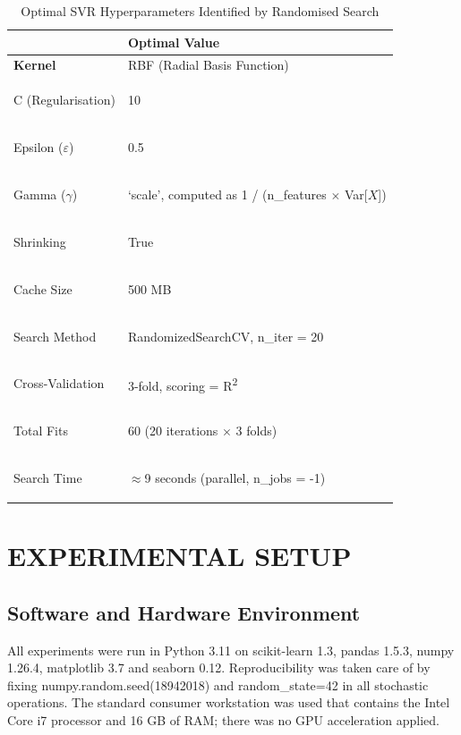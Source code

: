 \documentclass[pdflatex,sn-mathphys-num]{sn-jnl}
\begin{document}
\begin{table}[h]
\centering
\renewcommand{\arraystretch}{1.5}
\setlength{\tabcolsep}{10pt}

\caption{Optimal SVR Hyperparameters Identified by Randomised Search}
\begin{tabular}{|>{\bfseries}l|p{9cm}|}
\hline
\rowcolor[HTML]{2F4F7F}
\multicolumn{1}{|>{\color{white}\bfseries}l|}{\color{white} Hyperparameter} &
\multicolumn{1}{l|}{\color{white} Optimal Value} \\ \hline

Kernel & RBF (Radial Basis Function) \\ \hline

\rowcolor[HTML]{E6E6E6}
C (Regularisation) & 10 \\ \hline

Epsilon ($\varepsilon$) & 0.5 \\ \hline

\rowcolor[HTML]{E6E6E6}
Gamma ($\gamma$) & `scale', computed as 1 / (n\_features $\times$ Var[$X$]) \\ \hline

Shrinking & True \\ \hline

\rowcolor[HTML]{E6E6E6}
Cache Size & 500 MB \\ \hline

Search Method & RandomizedSearchCV, n\_iter = 20 \\ \hline

\rowcolor[HTML]{E6E6E6}
Cross-Validation & 3-fold, scoring = R\textsuperscript{2} \\ \hline

Total Fits & 60 (20 iterations $\times$ 3 folds) \\ \hline

\rowcolor[HTML]{E6E6E6}
Search Time & $\approx$9 seconds (parallel, n\_jobs = -1) \\ \hline

\end{tabular}
\end{table}

\section{EXPERIMENTAL SETUP}
\subsection{Software and Hardware Environment}
All experiments were run in Python 3.11 on scikit-learn 1.3, pandas 1.5.3, numpy 1.26.4, matplotlib 3.7 and seaborn 0.12. Reproducibility was taken care of by fixing numpy.random.seed(18942018) and random\_state=42 in all stochastic operations. The standard consumer workstation was used that contains the Intel Core i7 processor and 16 GB of RAM; there was no GPU acceleration applied.
\end{document}
